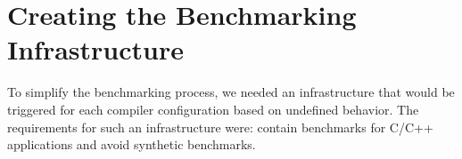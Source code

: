 \section{Creating the Benchmarking Infrastructure} \label{sec:benchmarks}

To simplify the benchmarking process, we needed an infrastructure that would be
triggered for each compiler configuration based on undefined behavior. The
requirements for such an infrastructure were: contain benchmarks for C/C++
applications and avoid synthetic benchmarks.
